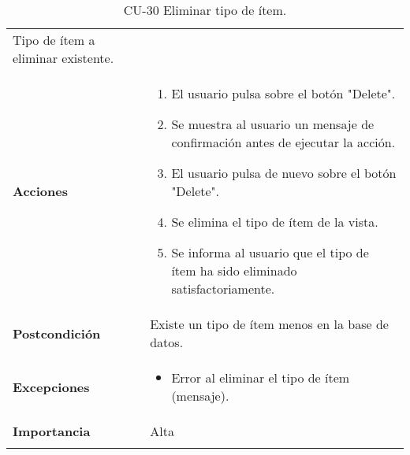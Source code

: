 \begin{longtable}[]{@{}ll@{}}
\begin{minipage}[t]{0.71\columnwidth}
Tipo de ítem a eliminar existente.\strut
\end{minipage}\tabularnewline
\begin{minipage}[t]{0.23\columnwidth}\raggedright
\textbf{Acciones}\strut
\end{minipage} & \begin{minipage}[t]{0.71\columnwidth}\raggedright
\begin{enumerate}
\def\labelenumi{\arabic{enumi}.}
\tightlist
\item
  El usuario pulsa sobre el botón "Delete".
\item
  Se muestra al usuario un mensaje de confirmación antes de ejecutar la
  acción.
\item
  El usuario pulsa de nuevo sobre el botón "Delete".
\item
  Se elimina el tipo de ítem de la vista.
\item
  Se informa al usuario que el tipo de ítem ha sido eliminado
  satisfactoriamente.
\end{enumerate}\strut
\end{minipage}\tabularnewline
\begin{minipage}[t]{0.23\columnwidth}\raggedright
\textbf{Postcondición}\strut
\end{minipage} & \begin{minipage}[t]{0.71\columnwidth}\raggedright
Existe un tipo de ítem menos en la base de datos.\strut
\end{minipage}\tabularnewline
\begin{minipage}[t]{0.23\columnwidth}\raggedright
\textbf{Excepciones}\strut
\end{minipage} & \begin{minipage}[t]{0.71\columnwidth}\raggedright
\begin{itemize}
\tightlist
\item
  Error al eliminar el tipo de ítem (mensaje).
\end{itemize}\strut
\end{minipage}\tabularnewline
\begin{minipage}[t]{0.23\columnwidth}\raggedright
\textbf{Importancia}\strut
\end{minipage} & \begin{minipage}[t]{0.71\columnwidth}\raggedright
Alta\strut
\end{minipage}\tabularnewline
\bottomrule
\caption{CU-30 Eliminar tipo de ítem.}
\end{longtable}

